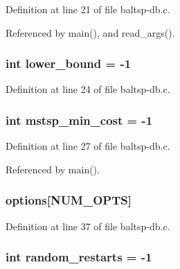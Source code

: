 Definition at line 21 of file baltsp-db.c.

Referenced by main(), and read\_\-args().\hypertarget{bin_2baltsp-db_8c_ed7394fd8e0c2796b26b9654fd10fd9d}{
\subsubsection[{lower\_\-bound}]{\setlength{\rightskip}{0pt plus 5cm}int {\bf lower\_\-bound} = -1}}
\label{bin_2baltsp-db_8c_ed7394fd8e0c2796b26b9654fd10fd9d}




Definition at line 24 of file baltsp-db.c.\hypertarget{bin_2baltsp-db_8c_79e1b33b7d744b8baacfe9c0b2e73013}{
\subsubsection[{mstsp\_\-min\_\-cost}]{\setlength{\rightskip}{0pt plus 5cm}int {\bf mstsp\_\-min\_\-cost} = -1}}
\label{bin_2baltsp-db_8c_79e1b33b7d744b8baacfe9c0b2e73013}




Definition at line 27 of file baltsp-db.c.

Referenced by main().\hypertarget{bin_2baltsp-db_8c_cea6a9709d519c143f30db401a0d0c72}{
\subsubsection[{options}]{ {\bf options}\mbox{[}NUM\_\-OPTS\mbox{]}}}
\label{bin_2baltsp-db_8c_cea6a9709d519c143f30db401a0d0c72}




Definition at line 37 of file baltsp-db.c.\hypertarget{bin_2baltsp-db_8c_e6a9db0fe5c8a0407d62dec2f7a14959}{
\subsubsection[{random\_\-restarts}]{\setlength{\rightskip}{0pt plus 5cm}int {\bf random\_\-restarts} = -1}}
\label{bin_2baltsp-db_8c_e6a9db0fe5c8a0407d62dec2f7a14959}





